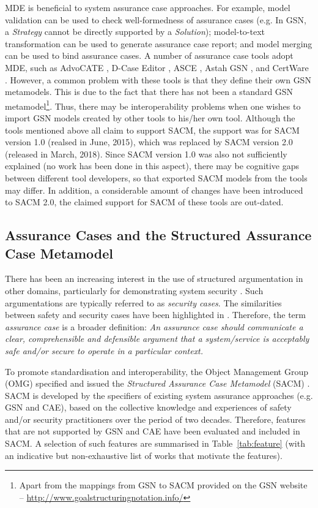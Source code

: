 MDE is beneficial to system assurance case approaches.
For example, model validation can be used to check well-formedness of assurance cases (e.g. In GSN, a \textit{Strategy} cannot be directly supported by a \textit{Solution}); model-to-text transformation can be used to generate assurance case report; and model merging can be used to bind assurance cases. 
A number of assurance case tools adopt MDE, such as AdvoCATE \cite{denney2017tool}, D-Case Editor \cite{matsuno2010dependability}, ASCE \cite{netkachova2014tool}, Astah GSN \cite{larrucea2017supporting}, and CertWare \cite{barry2011certware}. 
However, a common problem with these tools is that they define their own GSN metamodels. 
This is due to the fact that there has not been a standard GSN metamodel\footnote{Apart from the mappings from GSN to SACM provided on the GSN website -- \url{http://www.goalstructuringnotation.info/}}. 
Thus, there may be interoperability problems when one wishes to import GSN models created by other tools to his/her own tool. 
Although the tools mentioned above all claim to support SACM, the support was for SACM version 1.0 (realsed in June, 2015), which was replaced by SACM version 2.0 (released in March, 2018).
Since SACM version 1.0 was also not sufficiently explained (no work has been done in this aspect), there may be cognitive gaps between different tool developers, so that exported SACM models from the tools may differ.
In addition, a considerable amount of changes have been introduced to SACM 2.0, the claimed support for SACM of these tools are out-dated. 

\subsection{Assurance Cases and the Structured Assurance Case Metamodel}
\label{sec:ac_sacm}
There has been an increasing interest in the use of structured argumentation in other domains, particularly for demonstrating system security \cite{bloomfield2010safety}. 
Such argumentations are typically referred to as \textit{security cases}. 
The similarities between safety and security cases have been highlighted in \cite{lautieri2005safsec}. 
Therefore, the term \textit{assurance case} is a broader definition: \textit{An assurance case should communicate a clear, comprehensible and defensible argument that a system/service is acceptably safe and/or secure to operate in a particular context.} 

To promote standardisation and interoperability, the Object Management Group (OMG) specified and issued the \textit{Structured Assurance Case Metamodel} (SACM) \cite{sacm}. 
SACM is developed by the specifiers of existing system assurance approaches (e.g. GSN and CAE), based on the collective knowledge and experiences of safety and/or security practitioners over the period of two decades. 
Therefore, features that are not supported by GSN and CAE have been evaluated and included in SACM. 
A selection of such features are summarised in Table~\ref{tab:feature} (with an indicative but non-exhaustive list of works that motivate the features).

